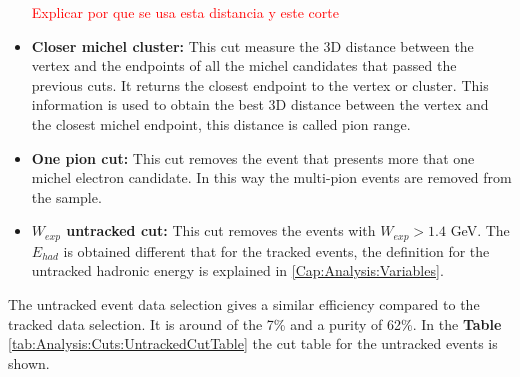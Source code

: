 \begin{itemize}
    \textcolor{red}{Explicar por que se usa esta distancia y este corte}
    
    \item \textbf{Closer michel cluster:} This cut measure the 3D distance between the vertex and the endpoints of all the michel candidates that passed the previous cuts. It returns the closest endpoint to the vertex or cluster. This information is used to obtain the best 3D distance between the vertex and the closest michel endpoint, this distance is called pion range. 
    \item \textbf{One pion cut:} This cut removes the event that presents more that one michel electron candidate. In this way the multi-pion events are removed from the sample.
    \item \textbf{$W_{exp}$ untracked cut:} This cut removes the events with $W_{exp} > 1.4$ GeV. The $E_{had}$ is obtained different that for the tracked events, the definition for the untracked hadronic energy is explained in \ref{Cap:Analysis:Variables}.

\end{itemize}

The untracked event data selection gives a similar efficiency compared to the tracked data selection. It is around of the 7\% and a purity of 62\%. In the \textbf{Table} \ref{tab:Analysis:Cuts:UntrackedCutTable} the cut table for the untracked events is shown. 

